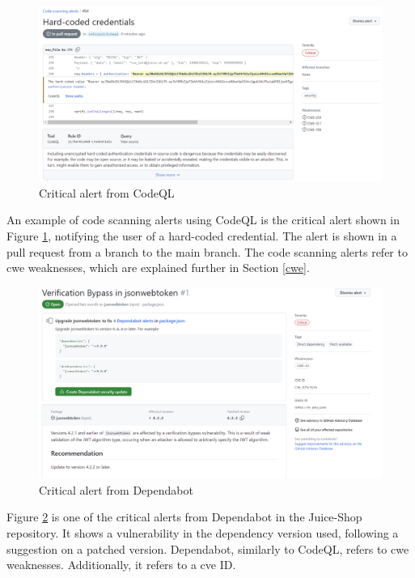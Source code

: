 \vspace{2mm}
\begin{figure}[H]
    \centering
    \includegraphics[width=0.8\columnwidth]{Images/codescan.png}
    \caption{Critical alert from CodeQL}
    \label{fig: Critical alert CodeQL}
\end{figure}

An example of code scanning alerts using CodeQL is the critical alert shown in Figure \ref{fig: Critical alert CodeQL}, notifying the user of a hard-coded credential. The alert is shown in a pull request from a branch to the main branch. The code scanning alerts refer to \acrshort{cwe} weaknesses, which are explained further in Section \ref{cwe}.

\vspace{2mm}
\begin{figure}[H]
    \centering
    \includegraphics[width=0.8\columnwidth]{Images/dependabotalert.png}
    \caption{Critical alert from Dependabot}
    \label{fig: Critical alert from Dependabot}
\end{figure}

Figure \ref{fig: Critical alert from Dependabot} is one of the critical alerts from Dependabot in the Juice-Shop repository. It shows a vulnerability in the dependency version used, following a suggestion on a patched version. Dependabot, similarly to CodeQL, refers to \acrshort{cwe} weaknesses. Additionally, it refers to a \acrshort{cve} ID. 

